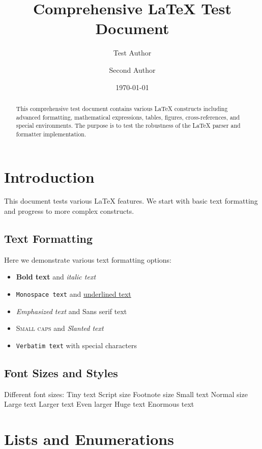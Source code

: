 \documentclass[12pt,a4paper,twoside]{article}
\title{Comprehensive LaTeX Test Document}
\author{Test Author \and Second Author}
\date{\today}
\begin{document}
\maketitle
\tableofcontents
\newpage

\begin{abstract}
This comprehensive test document contains various LaTeX constructs including advanced formatting, mathematical expressions, tables, figures, cross-references, and special environments. The purpose is to test the robustness of the LaTeX parser and formatter implementation.
\end{abstract}

\section{Introduction}

This document tests various LaTeX features. We start with basic text formatting and progress to more complex constructs.

\subsection{Text Formatting}

Here we demonstrate various text formatting options:
\begin{itemize}
    \item \textbf{Bold text} and \textit{italic text}
    \item \texttt{Monospace text} and \underline{underlined text}
    \item \emph{Emphasized text} and \textsf{Sans serif text}
    \item \textsc{Small caps} and \textsl{Slanted text}
    \item \verb|Verbatim text| with special characters
\end{itemize}

\subsection{Font Sizes and Styles}

Different font sizes:
{\tiny Tiny text} {\scriptsize Script size} {\footnotesize Footnote size} {\small Small text} Normal size {\large Large text} {\Large Larger text} {\LARGE Even larger} {\huge Huge text} {\Huge Enormous text}

\section{Lists and Enumerations}
\end{document}
